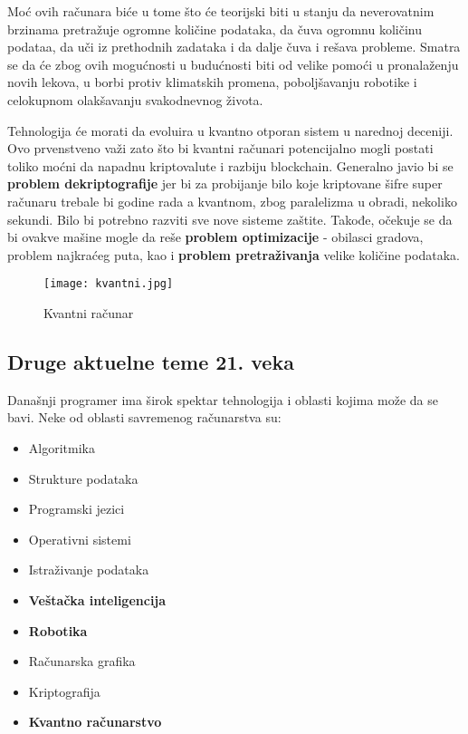 \documentclass[a4paper]{article}
\begin{document}
{Moć ovih računara biće u tome što će teorijski biti u stanju da neverovatnim brzinama pretražuje ogromne količine podataka, da čuva ogromnu količinu podataa, da uči iz prethodnih zadataka i da dalje čuva i rešava probleme. Smatra se da će zbog ovih mogućnosti u budućnosti biti od velike pomoći u pronalaženju novih lekova, u borbi protiv klimatskih promena, poboljšavanju robotike i celokupnom olakšavanju svakodnevnog života.

Tehnologija će morati da evoluira u kvantno otporan sistem u narednoj deceniji. Ovo prvenstveno važi zato što bi kvantni računari potencijalno mogli postati toliko moćni da napadnu kriptovalute i razbiju blockchain. Generalno javio bi se {\bf problem dekriptografije} jer bi za probijanje bilo koje
kriptovane šifre super računaru trebale bi godine rada
a kvantnom, zbog paralelizma u obradi, nekoliko
sekundi.  Bilo bi potrebno razviti sve nove sisteme zaštite.
Takođe, očekuje se da bi ovakve mašine mogle da reše {\bf problem optimizacije  }-
obilasci gradova, problem najkraćeg puta, kao i {\bf problem pretraživanja} velike količine podataka. 

\begin{figure}[h!]
\begin{center}
\texttt{[image: kvantni.jpg]}
\end{center}
\caption{Kvantni računar}
\label{fig:kvant}
\end{figure}

\setlength{\parskip}{1em}


\subsection{ Druge aktuelne teme 21. veka}	
Današnji programer ima širok spektar tehnologija i oblasti kojima može da se bavi. Neke od oblasti savremenog računarstva su:

		\begin{itemize}
		    \item Algoritmika 
\item Strukture podataka 
\item Programski jezici 
\item Operativni sistemi 
\item Istraživanje podataka 
\item \textbf{Veštačka inteligencija }
\item \textbf{Robotika} 
\item Računarska grafika 
\item Kriptografija 
\item\textbf{Kvantno računarstvo} 


\end{itemize}}
\end{document}
